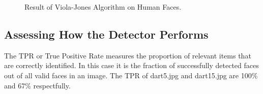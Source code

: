 \documentclass[a4paper]{article}
\begin{document}
\begin{figure}[H]
  \centering
  \hfill
   \hfill
   \hfill
   \hfill
   \hfill
   \caption{Result of Viola-Jones Algorithm on Human Faces.}
\end{figure}

\subsection*{Assessing How the Detector Performs}

The TPR or True Positive Rate measures the proportion of relevant items that
are correctly identified. In this case it is the fraction of successfully
detected faces out of all valid faces in an image. The TPR of dart5.jpg and
dart15.jpg are 100\% and 67\% respectfully.
\end{document}
